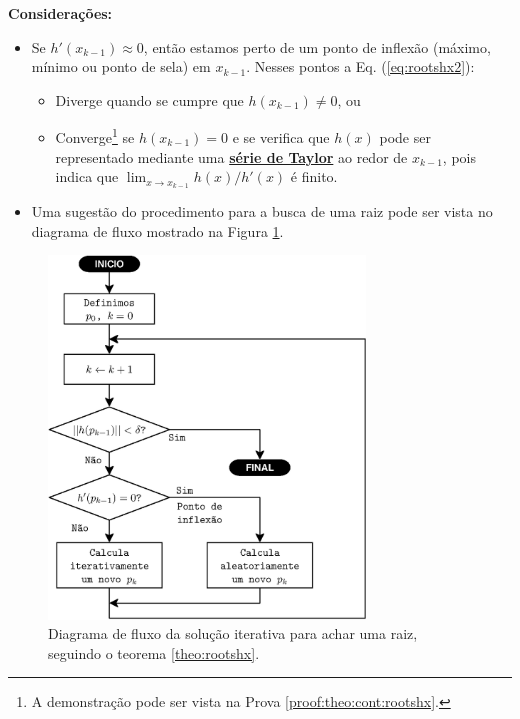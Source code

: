 \begin{theorem}
\textbf{Considerações:}
\begin{itemize} 
\item Se $h'(x_{k-1})\approx 0$, então estamos perto de um ponto de inflexão 
(máximo, mínimo ou ponto de sela) em $x_{k-1}$. Nesses pontos a Eq. (\ref{eq:rootshx2}): 
\begin{itemize}
\item Diverge quando se cumpre que $h(x_{k-1})\neq 0$, ou
\item Converge\footnote{A demonstração pode ser vista na Prova \ref{proof:theo:cont:rootshx}.} 
se $h(x_{k-1}) = 0$ e se verifica que $h(x)$ pode ser representado 
mediante uma \hyperref[def:taylor]{\textbf{série de Taylor}} ao redor de $x_{k-1}$, 
 pois indica que $\lim_{x\rightarrow x_{k-1}}  h(x)/h'(x)$ é finito.
\end{itemize}
\item Uma sugestão do procedimento para a busca de uma raiz pode ser vista no diagrama de fluxo
mostrado na Figura \ref{fig:fluxorhx1}. 
\end{itemize}
\end{theorem}

\begin{figure}[!h]
     \centering
         \includegraphics[width=0.75\textwidth]{chapters/roots/fluxo1.eps}
        \caption{Diagrama de fluxo da solução iterativa para achar uma raiz, seguindo o teorema \ref{theo:rootshx}.}
        \label{fig:fluxorhx1}
\end{figure}

